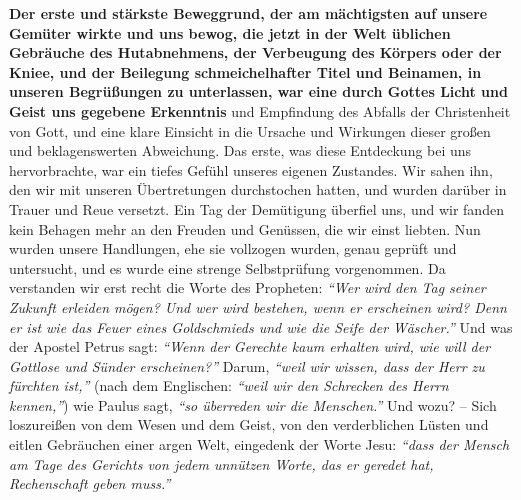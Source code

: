 \label{ref:09_05_offenbarung} \textbf{Der erste und stärkste Beweggrund, der am
mächtigsten auf unsere
Gemüter wirkte und uns bewog, die jetzt in der Welt üblichen Gebräuche des
Hutabnehmens, der Verbeugung des Körpers oder der Kniee, und
der Beilegung
schmeichelhafter Titel und Beinamen, in unseren Begrüßungen zu unterlassen, war
eine durch Gottes Licht und Geist uns gegebene
Erkenntnis}
und Empfindung des
Abfalls der Christenheit von Gott, und eine klare Einsicht in die Ursache und
Wirkungen dieser großen und beklagenswerten Abweichung. Das erste, was diese
Entdeckung bei uns hervorbrachte, war ein tiefes Gefühl unseres eigenen
Zustandes.
Wir sahen ihn, den wir mit unseren Übertretungen durchstochen hatten, und wurden
darüber in Trauer und Reue versetzt. Ein Tag der Demütigung
überfiel uns, und
wir fanden kein Behagen mehr an den Freuden und Genüssen, die wir einst liebten.
Nun wurden unsere Handlungen, ehe sie vollzogen wurden, genau geprüft und
untersucht, und es wurde eine strenge Selbstprüfung
vorgenommen. Da verstanden
wir erst recht die Worte des Propheten:
\textit{"`Wer wird den Tag seiner Zukunft
erleiden mögen? Und wer wird bestehen, wenn er erscheinen wird? Denn er ist wie
das Feuer eines Goldschmieds und wie die Seife der Wäscher."'}
Und was der Apostel Petrus sagt:
\textit{"`Wenn der Gerechte kaum erhalten wird, wie will der Gottlose und Sünder
erscheinen?"'}
Darum,
\textit{"`weil wir wissen, dass der Herr zu fürchten ist,"'}
(nach dem Englischen:
\textit{"`weil wir den Schrecken des Herrn kennen,"'}) wie Paulus sagt,
\textit{"`so überreden wir die Menschen."'}
Und wozu? -- Sich loszureißen von dem Wesen
und dem Geist, von den verderblichen Lüsten und eitlen Gebräuchen einer argen
Welt,
eingedenk der Worte Jesu:
\textit{"`dass der Mensch am Tage des Gerichts von jedem
unnützen Worte, das er geredet hat, Rechenschaft geben
muss."'}

\medskip

